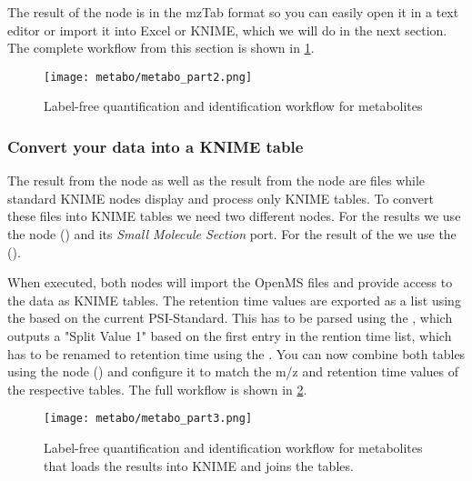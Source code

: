 The result of the  node is in the mzTab format \cite{Griss2014} so you can easily open it in a text editor or import it into Excel or KNIME, which we will do in the next section.
The complete workflow from this section is shown in \cref{fig:metabo_part2}.

\begin{figure}[htbp]
  \centering
  \texttt{[image: metabo/metabo\_part2.png]}
  \caption{Label-free quantification and identification workflow for metabolites}
  \label{fig:metabo_part2}
\end{figure}

\subsubsection{Convert your data into a KNIME table}

The result from the  node as well as the result from the  node are files while standard KNIME nodes display and process only KNIME tables. To convert these files into KNIME tables we need two different nodes.
For the  results we use the  node () and its \textit{Small Molecule Section} port. For the result of the  we use the  ().

When executed, both nodes will import the OpenMS files and provide access to the data as KNIME tables. The retention time values are exported as a list using the  based on the current PSI-Standard. This has to be parsed using the , which outputs a "Split Value 1" based on the first entry in the rention time list, which has to be renamed to retention time using the . You can now combine both tables using the  node () and configure it to match the m/z and retention time values of the respective tables. The full workflow is shown in \cref{fig:metabo_part3}.

\begin{figure}[htbp]
  \centering
  \texttt{[image: metabo/metabo\_part3.png]}
  \caption{Label-free quantification and identification workflow for metabolites that loads the results into KNIME and joins the tables.}
  \label{fig:metabo_part3}
\end{figure}

